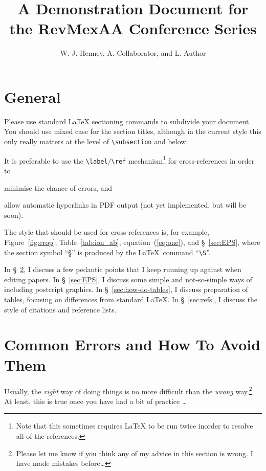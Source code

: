 \documentclass[preprint]{rmxac}
\title{A Demonstration Document for the RevMexAA Conference Series}
\author{
  W. J. Henney,\altaffilmark{1} 
  A. Collaborator,\altaffilmark{2}
  and L. Author\altaffilmark{2,3,4}}
\newcommand{\CS}[1]{\texttt{\textbackslash #1}}
\begin{document}
\maketitle


\section{General}
\label{sec:intro}

Please use standard \LaTeX{} sectioning commands to subdivide your
document. You should use mixed case for the section titles, although
in the current style this only really matters at the level of
\CS{subsection} and below. 

It is preferable to use the \CS{label}/\CS{ref}
mechanism\footnote{Note that this sometimes requires \LaTeX{} to be
  run twice inorder to resolve all of the references.} for
cross-references in order to
\begin{inparaenum}[(1)]
\item minimise the chance of errors, and 
\item allow automatic hyperlinks in PDF output (not yet implemented,
  but will be soon). 
\end{inparaenum}

The style that should be used for cross-references is, for example,
Figure~\ref{fig:crop}, Table~\ref{tab:ion_ab},
equation~(\ref{eq:one}), and \S~\ref{sec:EPS}, where the section
symbol ``\S'' is produced by the \LaTeX\ command ``\CS{S}''.

In \S~\ref{sec:errors}, I discuss a few pedantic points that I keep
running up against when editing papers. In \S~\ref{sec:EPS}, I discuss
some simple and not-so-simple ways of including postcript graphics. In
\S~\ref{sec:how-do-tables}, I discuss preparation of tables, focusing
on differences from standard \LaTeX{}. In \S~\ref{sec:refs}, I discuss
the style of citations and reference lists. 

\section{Common Errors and How To Avoid Them}
\label{sec:errors}

Usually, the \emph{right} way of doing things is no more difficult
than the \emph{wrong} way.\footnote{Please let me know if you think
  any of my advice in this section is wrong. I have made mistakes
  before\dots} At least, this is true once you have had a bit of
practice \dots
\end{document}
